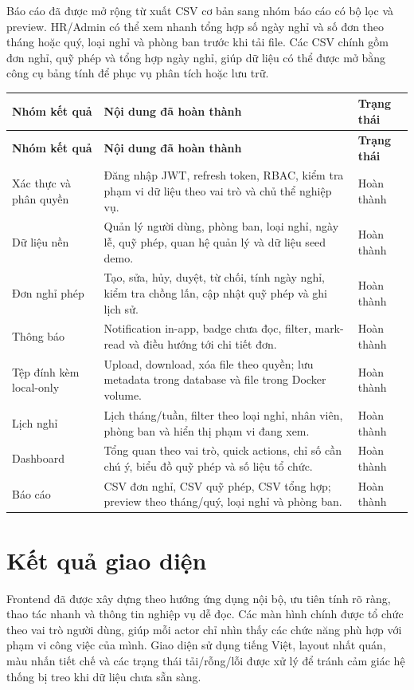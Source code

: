 Báo cáo đã được mở rộng từ xuất CSV cơ bản sang nhóm báo cáo có bộ lọc và preview. HR/Admin có thể xem nhanh tổng hợp số ngày nghỉ và số đơn theo tháng hoặc quý, loại nghỉ và phòng ban trước khi tải file. Các CSV chính gồm đơn nghỉ, quỹ phép và tổng hợp ngày nghỉ, giúp dữ liệu có thể được mở bằng công cụ bảng tính để phục vụ phân tích hoặc lưu trữ.

\begin{longtable}{p{}p{}p{}}
\toprule
\textbf{Nhóm kết quả} & \textbf{Nội dung đã hoàn thành} & \textbf{Trạng thái} \\
\midrule
\endfirsthead
\toprule
\textbf{Nhóm kết quả} & \textbf{Nội dung đã hoàn thành} & \textbf{Trạng thái} \\
\midrule
\endhead
Xác thực và phân quyền & Đăng nhập JWT, refresh token, RBAC, kiểm tra phạm vi dữ liệu theo vai trò và chủ thể nghiệp vụ. & Hoàn thành \\
Dữ liệu nền & Quản lý người dùng, phòng ban, loại nghỉ, ngày lễ, quỹ phép, quan hệ quản lý và dữ liệu seed demo. & Hoàn thành \\
Đơn nghỉ phép & Tạo, sửa, hủy, duyệt, từ chối, tính ngày nghỉ, kiểm tra chồng lấn, cập nhật quỹ phép và ghi lịch sử. & Hoàn thành \\
Thông báo & Notification in-app, badge chưa đọc, filter, mark-read và điều hướng tới chi tiết đơn. & Hoàn thành \\
Tệp đính kèm local-only & Upload, download, xóa file theo quyền; lưu metadata trong database và file trong Docker volume. & Hoàn thành \\
Lịch nghỉ & Lịch tháng/tuần, filter theo loại nghỉ, nhân viên, phòng ban và hiển thị phạm vi đang xem. & Hoàn thành \\
Dashboard & Tổng quan theo vai trò, quick actions, chỉ số cần chú ý, biểu đồ quỹ phép và số liệu tổ chức. & Hoàn thành \\
Báo cáo & CSV đơn nghỉ, CSV quỹ phép, CSV tổng hợp; preview theo tháng/quý, loại nghỉ và phòng ban. & Hoàn thành \\
\bottomrule
\end{longtable}

\section{Kết quả giao diện}
Frontend đã được xây dựng theo hướng ứng dụng nội bộ, ưu tiên tính rõ ràng, thao tác nhanh và thông tin nghiệp vụ dễ đọc. Các màn hình chính được tổ chức theo vai trò người dùng, giúp mỗi actor chỉ nhìn thấy các chức năng phù hợp với phạm vi công việc của mình. Giao diện sử dụng tiếng Việt, layout nhất quán, màu nhấn tiết chế và các trạng thái tải/rỗng/lỗi được xử lý để tránh cảm giác hệ thống bị treo khi dữ liệu chưa sẵn sàng.

